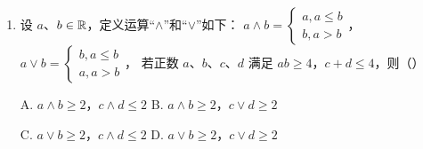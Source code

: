 \documentclass[a4paper,11pt]{article}
\begin{document}
\begin{enumerate}
\keepwithprev
①若 $\dfrac1b-\dfrac1a=1$，则 $a-b\leqslant1$；

②若 $a^3-b^3=1$，则 $a-b\leqslant1$；

③若 $a$、$b$ 均为正数，且 $a^2-b^2=1$，则 $a-b\leqslant1$；

④若 $a$、$b$ 均为正数，且 $\sqrt a-\sqrt b=1$，则 $a-b\geqslant1$.

则所有正确判断的序号是\mbox{（\quad）}

\keepwithprev
A. ①②\qquad\qquad B. ③\qquad\qquad C. ③④\qquad\qquad D. ②④


\ifanswer
\solbegin
{}
\solend

\fi

\item 设 $a$、$b\in\mathbb{R}$，定义运算“$\wedge$”和“$\vee$”如下：
$a\wedge b=\begin{cases}a,a\leqslant b\\ b,a>b\end{cases}$，
$a\vee b=\begin{cases}b,a\leqslant b\\ a,a>b\end{cases}$，
若正数 $a$、$b$、$c$、$d$ 满足 $ab\geqslant4$，$c+d\leqslant4$，则\mbox{（\quad）}

\keepwithprev
A. $a\wedge b\geqslant2$，$c\wedge d\leqslant2$\qquad
B. $a\wedge b\geqslant2$，$c\vee d\geqslant2$

C. $a\vee b\geqslant2$，$c\wedge d\leqslant2$\qquad
D. $a\vee b\geqslant2$，$c\vee d\geqslant2$


\ifanswer
\solbegin
{}
\solend

\fi

\end{enumerate}
\end{document}
